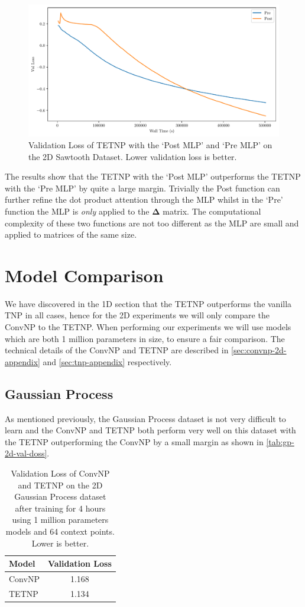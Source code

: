 \documentclass[../../main.tex]{subfiles}
\begin{document}
\begin{figure}[H]
    \centering
    \includegraphics[width=0.6\linewidth]{./fig/post-pre-kernel.pdf}
    \caption{Validation Loss of TETNP with the `Post MLP' and `Pre MLP' on the 2D Sawtooth Dataset. Lower validation loss is better.}
    \label{fig:post-pre-kernel}
\end{figure}


The results show that the TETNP with the `Post MLP' outperforms the TETNP with the `Pre MLP' by quite a large margin. Trivially the Post function can further refine the dot product attention through the MLP whilst in the `Pre' function the MLP is \emph{only} applied to the $\bm{\Delta}$ matrix. The computational complexity of these two functions are not too different as the MLP are small and applied to matrices of the same size.

\section{Model Comparison}

We have discovered in the 1D section that the TETNP outperforms the vanilla TNP in all cases, hence for the 2D experiments we will only compare the ConvNP to the TETNP. When performing our experiments we will use models which are both 1 million parameters in size, to ensure a fair comparison. The technical details of the ConvNP and TETNP are described in \autoref{sec:convnp-2d-appendix} and \autoref{sec:tnp-appendix} respectively.

\subsection{Gaussian Process}

As mentioned previously, the Gaussian Process dataset is not very difficult to learn and the ConvNP and TETNP both perform very well on this dataset with the TETNP outperforming the ConvNP by a small margin as shown in \autoref{tab:gp-2d-val-doss}.

\begin{table}[ht]
    \centering
    \begin{tabular}{lc}
        \toprule
        Model  & Validation Loss \\
        \midrule
        ConvNP & 1.168           \\
        TETNP  & 1.134           \\
        \bottomrule
    \end{tabular}
    \caption{Validation Loss of ConvNP and TETNP on the 2D Gaussian Process dataset after training for 4 hours using 1 million parameters models and 64 context points. Lower is better.}
    \label{tab:gp-2d-val-doss}
\end{table}
\end{document}
